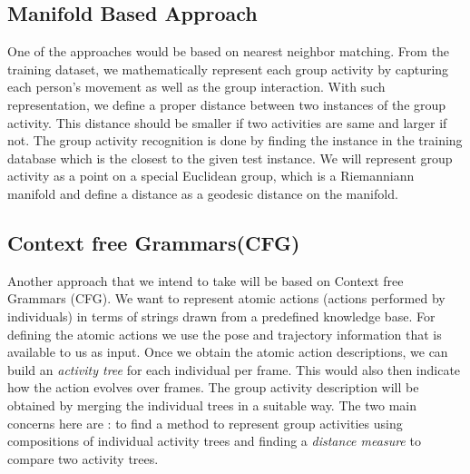 \documentclass[12pt,twocolumn]{article}   %
\begin{document}
\subsection*{Manifold Based Approach}
One of the approaches would be based on nearest neighbor matching. From the training dataset, we mathematically represent each group activity by capturing each person's movement as well as the group interaction. With such representation, we define a proper distance between two instances of the group activity. This distance should be smaller if two activities are same and larger if not. The group activity recognition is done by finding the instance in the training database which is the closest to the given test instance. We will represent group activity as a point on a special Euclidean group, which is a Riemanniann manifold and define a distance as a geodesic distance on the manifold.

\subsection*{Context free Grammars(CFG)}
Another approach that we intend to take will be based on Context free Grammars (CFG). We want to represent atomic actions (actions performed by individuals) in terms of strings drawn from a predefined knowledge base. For defining the atomic actions we use the pose and trajectory information that is available to us as input. Once we obtain the atomic action descriptions, we can build an \textit{activity tree} for each individual per frame. This would also then indicate how the action evolves over frames. The group activity description will be obtained by merging the individual trees in a suitable way. The two main concerns here are : to find a method to represent group activities using compositions of individual activity trees and finding a \textit{distance measure} to compare two activity trees. 
\end{document}
